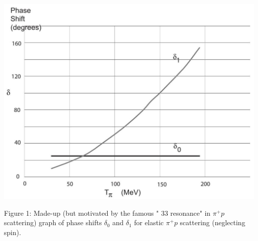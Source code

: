\documentclass[12pt]{article}
\begin{document}
\begin{center}
\includegraphics[max width=\textwidth]{2024_03_02_e4ccbaaa87e764c710bfg-3}
\end{center}

Figure 1: Made-up (but motivated by the famous " 33 resonance" in $\pi^{+} p$ scattering) graph of phase shifts $\delta_{0}$ and $\delta_{1}$ for elastic $\pi^{+} p$ scattering (neglecting spin).
\end{document}
